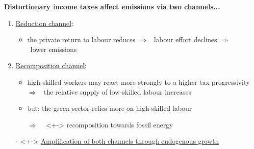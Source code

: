 \documentclass[11pt,aspectratio=169]{beamer}
\newcommand{\ar}{$\Rightarrow$ \ }
\begin{document}
\begin{frame}	\alert{\textbf{Distortionary income taxes affect emissions via two channels...}}
	\pause
	\vspace{4mm}
	\begin{enumerate}
		\item<+-> \underline{Reduction channel}: 
		\vspace{2mm}
		\begin{itemize}
			\item<+-> the private return to labour reduces \ar labour effort declines \ar lower emissions %
		\end{itemize}
		\vspace{3mm}
		\item<+-> \underline{Recomposition channel}:
		\vspace{2mm}
		\begin{itemize}
			\item<+->  high-skilled workers may react more strongly to a higher tax progressivity \\ \ar the relative supply of low-skilled labour increases
			\item<+-> but: the green sector relies more on high-skilled labour \citep{Consoli2016DoCapital}
			\item[\ar]<+-> recomposition towards fossil energy
		\end{itemize}
		\vspace{3mm}
		\item[-]<+-> \underline{Amplification of both channels through endogenous growth}
	\end{enumerate}
\end{frame}
\end{document}
